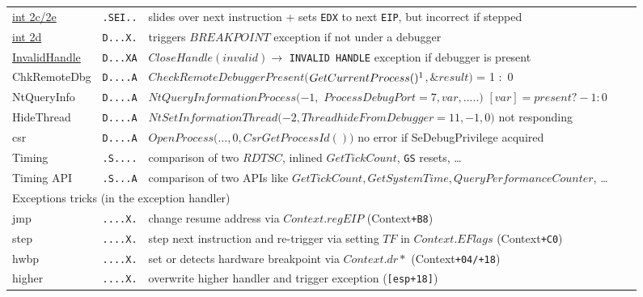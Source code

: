 \begin{tabular}{lllll}
\href{http://corkami.blogspot.com/2010/03/si-cest-ton-corps-qui-bouge-cest-ton.html}
{int 2c/2e} 			& {\tt .SEI..} & slides over next instruction + sets {\tt EDX} to next {\tt EIP}, but incorrect if stepped\\
\href{http://corkami.blogspot.com/2010/02/and-when-i-start-to-come-undone-stitch.html}
{int 2d}			& {\tt D...X.} & triggers $BREAKPOINT$ exception if not under a debugger\\
\href{http://corkami.blogspot.com/2010/02/and-when-i-start-to-come-undone-stitch.html}
{InvalidHandle}		& {\tt D...XA} & $CloseHandle(invalid) \rightarrow$ {\tt INVALID HANDLE} exception if debugger is present\\
ChkRemoteDbg		& {\tt D....A} & {\small $CheckRemoteDebuggerPresent$}$(${\small $GetCurrentProcess()\footnotemark$}$, \&result)$ = 1 :\ 0\\
NtQueryInfo			& {\tt D....A} & {\small $NtQueryInformationProcess$}$(-1,$ {\small $ProcessDebugPort =$}$ 7, var, .....)$ \ra $[var] = present ? -1:0$ \\
HideThread			& {\tt D....A} & {\small $NtSetInformationThread$}$(-2, ${\small $ThreadhideFromDebugger$}$ = 11, -1, 0)$ \ra not responding \\
csr				& {\tt D....A} & {\small $OpenProcess$}$(\ldots, 0, ${\small $CsrGetProcessId$\footnotemark}$())$ \ra no error if {\small SeDebugPrivilege} acquired \\
Timing			& {\tt .S....} & comparison of two $RDTSC$, inlined $GetTickCount$\footnotemark, {\tt GS} resets, \ldots\\
Timing API			& {\tt .S...A} & comparison of two APIs like {\small $GetTickCount, GetSystemTime, QueryPerformanceCounter$}, \ldots \rowcolors{0}{white}{lightgray}
\\
\midrule
\multicolumn{3}{l}{Exceptions tricks (in the exception handler)} \\
\midrule
jmp				& {\tt ....X.} & change resume address via $Context.regEIP$ (Context{\tt +B8})\\
step				& {\tt ....X.} & step next instruction and re-trigger via setting $TF$ in $Context.EFlags$ (Context{\tt +C0})\\
hwbp				& {\tt ....X.} & set or detects hardware breakpoint via $Context.dr*$ (Context{\tt +04/+18})\\
higher			& {\tt ....X.} & overwrite higher handler and trigger exception ({\tt [esp+18]})\\

\end{tabular}

